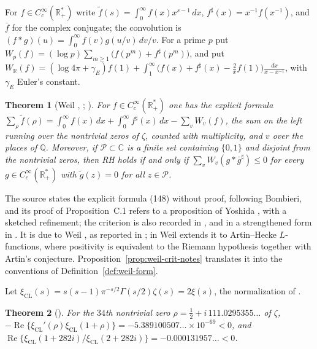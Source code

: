 \documentclass[11pt]{amsart}
\theoremstyle{plain}
\newtheorem{theorem}{Theorem}[section]
\theoremstyle{definition}
\theoremstyle{remark}
\numberwithin{equation}{section}
\newcommand{\C}{\mathbb{C}}
\newcommand{\R}{\mathbb{R}}
\newcommand{\Q}{\mathbb{Q}}
\DeclareMathOperator{\Rea}{Re}
\renewcommand{\Re}{\Rea}
\begin{document}
For $f\in C_c^\infty(\R_+^*)$ write $\widetilde f(s)=\int_0^\infty
f(x)x^{s-1}\,dx$, $f^\sharp(x)=x^{-1}f(x^{-1})$, and $\bar f$ for the
complex conjugate; the convolution is $(f*g)(u)=\int_0^\infty
f(v)g(u/v)\,dv/v$. For a prime $p$ put
$W_p(f)=(\log p)\sum_{m\ge1}\bigl(f(p^m)+f^\sharp(p^m)\bigr)$, and put
$W_\R(f)=(\log4\pi+\gamma_E)f(1)+\int_1^\infty\bigl(f(x)+f^\sharp(x)
-\tfrac2xf(1)\bigr)\frac{dx}{x-x^{-1}}$, with $\gamma_E$ Euler's
constant.

\begin{theorem}[{Weil \cite{Weil1952Explicit},
\cite[\S16, p.~16]{Weil1972Explicit};
\cite[(148), p.~50, and Proposition~C.1,
p.~51]{ConnesConsani2020WeilPositivity}}]\label{thm:imp-weil-crit}
For $f\in C_c^\infty(\R_+^*)$ one has the explicit formula
$\sum_\rho\widetilde f(\rho)=\int_0^\infty f(x)\,dx+\int_0^\infty
f^\sharp(x)\,dx-\sum_vW_v(f)$, the sum on the left running over the
nontrivial zeros of $\zeta$, counted with multiplicity, and $v$ over
the places of $\Q$. Moreover, if $\mathcal P\subset\C$ is a finite set
containing $\{0,1\}$ and disjoint from the nontrivial zeros, then RH
holds if and only if $\sum_vW_v(g*\bar g^\sharp)\le0$ for every
$g\in C_c^\infty(\R_+^*)$ with $\widetilde g(z)=0$ for all
$z\in\mathcal P$.
\end{theorem}

The source states the explicit formula (148) without proof, following
Bombieri, and its proof of Proposition~C.1 refers to a proposition of
Yoshida \cite[Proposition~1 and Lemma~1, p.~285]{Yoshida1992Hermitian},
with a sketched refinement; the criterion is also recorded in
\cite[\S V, pp.~8--9]{Bombieri2000Clay}, and in a strengthened form in
\cite[Theorem~1, p.~191]{Bombieri2000Lincei}. It is due to Weil
\cite{Weil1952Explicit}, as reported in \cite[\S V, p.~9]{Bombieri2000Clay};
in \cite[\S16, p.~16]{Weil1972Explicit} Weil extends it to
Artin--Hecke $L$-functions, where positivity is equivalent to the
Riemann hypothesis together with Artin's conjecture.
Proposition~\ref{prop:weil-crit-notes} translates it
into the conventions of Definition~\ref{def:weil-form}.

Let $\xi_{\mathrm{CL}}(s)=s(s-1)\pi^{-s/2}\Gamma(s/2)\zeta(s)=2\xi(s)$,
the normalization of \cite{ConreyLi2000Positivity}.

\begin{theorem}[{\cite[\S3.1, (3.2) p.~6 and~(3.4) p.~7]%
{ConreyLi2000Positivity}}]\label{thm:imp-conrey-li}
For the $34$th nontrivial zero $\rho=\tfrac12+i\,111.0295355\ldots$ of
$\zeta$, $-\Re\{\xi_{\mathrm{CL}}'(\rho)\xi_{\mathrm{CL}}(1+\rho)\}
=-5.389100507\ldots\times10^{-69}<0$, and
$\Re\{\xi_{\mathrm{CL}}(1+282i)/\xi_{\mathrm{CL}}(2+282i)\}
=-0.000131957\ldots<0$.
\end{theorem}
\end{document}
